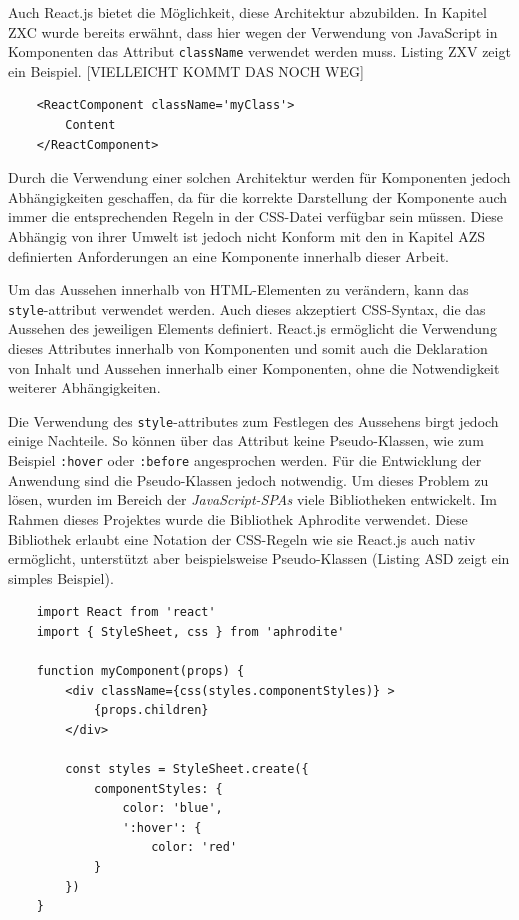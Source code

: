 Auch React.js bietet die Möglichkeit, diese Architektur abzubilden. In Kapitel ZXC wurde bereits erwähnt, dass hier wegen der Verwendung von JavaScript in Komponenten das Attribut \verb|className| verwendet werden muss. Listing ZXV zeigt ein Beispiel. [VIELLEICHT KOMMT DAS NOCH WEG]

\begin{lstlisting}
	<ReactComponent className='myClass'>
	 	Content
	</ReactComponent>
\end{lstlisting}

Durch die Verwendung einer solchen Architektur werden für Komponenten jedoch Abhängigkeiten geschaffen, da für die korrekte Darstellung der Komponente auch immer die entsprechenden Regeln in der CSS-Datei verfügbar sein müssen.
Diese Abhängig von ihrer Umwelt ist jedoch nicht Konform mit den in Kapitel AZS definierten Anforderungen an eine Komponente innerhalb dieser Arbeit.

Um das Aussehen innerhalb von HTML-Elementen zu verändern, kann das \verb|style|-attribut verwendet werden. Auch dieses akzeptiert CSS-Syntax, die das Aussehen des jeweiligen Elements definiert.
React.js ermöglicht die Verwendung dieses Attributes innerhalb von Komponenten und somit auch die Deklaration von Inhalt und Aussehen innerhalb einer Komponenten, ohne die Notwendigkeit weiterer Abhängigkeiten.

Die Verwendung des \verb|style|-attributes zum Festlegen des Aussehens birgt jedoch einige Nachteile. So können über das Attribut keine Pseudo-Klassen, wie zum Beispiel \verb|:hover| oder \verb|:before| angesprochen werden. \cite{w3c2017styles}
Für die Entwicklung der Anwendung sind die Pseudo-Klassen jedoch notwendig.
Um dieses Problem zu lösen, wurden im Bereich der \textit{JavaScript-SPAs} viele Bibliotheken entwickelt. Im Rahmen dieses Projektes wurde die Bibliothek Aphrodite\footnotemark{} verwendet.
Diese Bibliothek erlaubt eine Notation der CSS-Regeln wie sie React.js auch nativ ermöglicht, unterstützt aber beispielsweise Pseudo-Klassen (Listing ASD zeigt ein simples Beispiel).


\begin{lstlisting}
	import React from 'react'
	import { StyleSheet, css } from 'aphrodite'

	function myComponent(props) {
		<div className={css(styles.componentStyles)} >
			{props.children}
		</div>

		const styles = StyleSheet.create({
			componentStyles: {
				color: 'blue',
				':hover': {
					color: 'red'
			}
		})
	}
\end{lstlisting}

